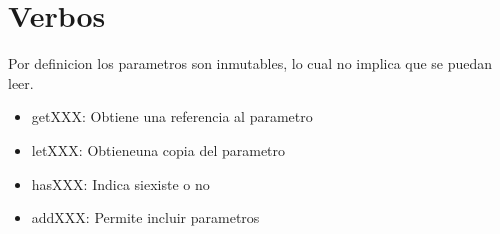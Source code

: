 \documentclass[
]{book}
\providecommand{\tightlist}{%
  \setlength{\itemsep}{0pt}\setlength{\parskip}{0pt}}
\begin{document}
\hypertarget{verbos}{%
\chapter{Verbos}\label{verbos}}

Por definicion los parametros son inmutables, lo cual no implica que se puedan leer.

\begin{itemize}
\tightlist
\item
  getXXX: Obtiene una referencia al parametro
\item
  letXXX: Obtieneuna copia del parametro
\item
  hasXXX: Indica siexiste o no
\item
  addXXX: Permite incluir parametros
\end{itemize}

  
\end{document}
